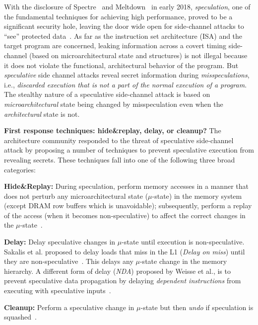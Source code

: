 With the disclosure of Spectre~\cite{kocher_spectre_2018} and Meltdown~\cite{lipp_meltdown_2018} in early 2018, \emph{speculation}, one of the fundamental techniques for achieving high
performance, proved to be a significant security hole, leaving the door wide
open for side-channel attacks to ``see'' protected data~\cite{kocher_spectre_2018,lipp_meltdown_2018}.
As far as the instruction set architecture (ISA) and the target program are
concerned, leaking information across a covert timing side-channel (based on microarchitectural state and structures) is not illegal
because it does not violate the functional, architectural behavior of the program.
But \emph{speculative} side channel attacks reveal secret information during \emph{misspeculations}, 
i.e., \emph{discarded execution that is not a part of the normal execution of a program}.
The stealthy nature of a speculative side-channel attack is based on
\emph{microarchitectural} state being changed by misspeculation even when the \emph{architectural}
state is not.

\noindent \textbf{First response techniques: hide\&replay, delay, or cleanup?}
The architecture community responded to the threat of speculative side-channel attack by proposing a number of techniques to prevent speculative execution from revealing secrets. These techniques fall into one of the following three broad categories:
\squishlist
\item{\textbf{Hide\&Replay:}} During speculation, perform memory accesses in a manner that does not perturb any microarchitectural state ($\mu$-state) in the memory system (except DRAM row buffers which is unavoidable); subsequently, perform a replay of the access (when it becomes non-speculative) to affect the correct changes in the $\mu$-state~\cite{yan_invisispec:MICRO2018,sakalis2019ghost}. 
\item{\textbf{Delay:}} Delay speculative changes in $\mu$-state until execution is non-speculative. Sakalis et al. proposed to delay loads that miss in the L1 (\emph{Delay on miss}) until they are non-speculative~\cite{sakalis2019efficient}. This delays any $\mu$-state change in the memory hierarchy. A different form of delay (\emph{NDA}) proposed by Weisse et al., is to prevent speculative data propagation by delaying \emph{dependent instructions} from executing with speculative inputs~\cite{weisse2019nda}.
\item{\textbf{Cleanup:}} Perform a speculative change in $\mu$-state but then \emph{undo} if speculation is squashed~\cite{saileshwar2019cleanupspec}.
\squishend

